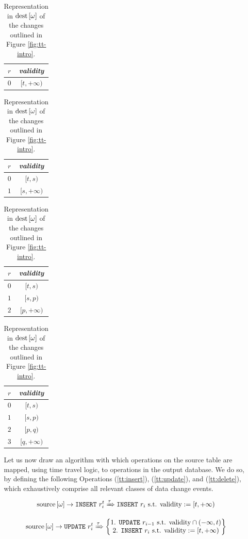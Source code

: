 \begin{table}
	\centering
	\begin{tabular}{cc}
		$r$ & \emph{validity} \\
		\hline
		$0$ & $[t, +\infty)$ \\
	\end{tabular}
	\hspace{1mm}
	\begin{tabular}{cc}
		$r$ & \emph{validity} \\
		\hline
		$0$ & $[t, s)$ \\
		$1$ & $[s, +\infty)$ \\
	\end{tabular}
	\hspace{1mm}
	\begin{tabular}{cc}
		$r$ & \emph{validity} \\
		\hline
		$0$ & $[t, s)$ \\
		$1$ & $[s, p)$ \\
		$2$ & $[p, +\infty)$ \\
	\end{tabular}
	\hspace{1mm}
	\begin{tabular}{cc}
		$r$ & \emph{validity} \\
		\hline
		$0$ & $[t, s)$ \\
		$1$ & $[s, p)$ \\
		$2$ & $[p, q)$ \\
		$3$ & $[q, +\infty)$ \\
	\end{tabular}
	\caption{Representation in $\text{dest}\left[{\omega}\right]$ of the changes outlined in Figure \ref{fig:tt-intro}.}
	\label{tab:tt-validity}
\end{table}

Let us now draw an algorithm with which operations on the source table are mapped, using time travel logic, to operations in the output database.
We do so, by defining the following Operations (\ref{tt:insert}), (\ref{tt:update}), and (\ref{tt:delete}), which exhaustively comprise all relevant classes of data change events.

\begin{equation}\label{tt:insert}
	\text{source}\left[{\omega}\right] \rightarrow \text{\texttt{INSERT} } r_i^t \xRightarrow{\tau}
	\text{\texttt{INSERT} } r_i \text{ s.t. } \text{validity} := [t, +\infty)
\end{equation}

\begin{equation}\label{tt:update}
	\text{source}\left[{\omega}\right] \rightarrow \text{\texttt{UPDATE} } r_i^t \xRightarrow{\tau}
	\begin{Bmatrix}
		\text{1. \texttt{UPDATE} } r_{i-1} \text{ s.t. } \text{validity} \cap (-\infty, t) \\
		\text{2. \texttt{INSERT} } r_i \text{ s.t. } \text{validity} := [t, +\infty)
	\end{Bmatrix}
\end{equation}

